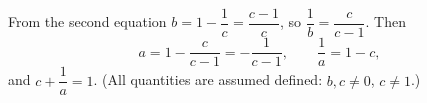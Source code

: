 From the second equation $b=1-\dfrac{1}{c}=\dfrac{c-1}{c}$, so $\dfrac{1}{b}=\dfrac{c}{c-1}$. Then
\[a=1-\dfrac{c}{c-1}=-\dfrac{1}{c-1},\qquad\dfrac{1}{a}=1-c,\]
and $c+\dfrac{1}{a}=\boxed{1}$. (All quantities are assumed defined: $b,c\ne0$, $c\ne1$.)
